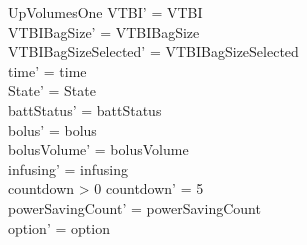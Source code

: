 \begin{schema}{UpVolumesOne}
	VTBI' = VTBI\\
	VTBIBagSize' = VTBIBagSize\\ VTBIBagSizeSelected' = VTBIBagSizeSelected\\
	time' = time\\ State' = State\\
	battStatus' = battStatus\\
	bolus' = bolus\\
	bolusVolume' = bolusVolume\\
	infusing' = infusing\\
	countdown > 0 \land countdown' = 5\\
	powerSavingCount' = powerSavingCount\\ option' = option\\
\end{schema}

